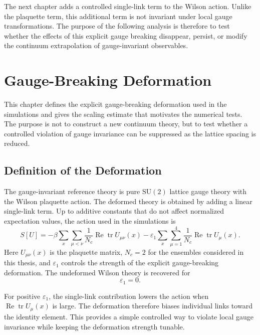 \documentclass[12pt,a4paper,oneside,numbers=noenddot]{scrreprt}
\newcommand{\SU}{\mathrm{SU}}
\newcommand{\eps}{\varepsilon}
\begin{document}
The next chapter adds a controlled single-link term to the Wilson action. Unlike
the plaquette term, this additional term is not invariant under local gauge
transformations. The purpose of the following analysis is therefore to test
whether the effects of this explicit gauge breaking disappear, persist, or
modify the continuum extrapolation of gauge-invariant observables.

\chapter{Gauge-Breaking Deformation}
\label{chap:small-breaking}

This chapter defines the explicit gauge-breaking deformation used in the
simulations and gives the scaling estimate that motivates the numerical tests.
The purpose is not to construct a new continuum theory, but to test whether a
controlled violation of gauge invariance can be suppressed as the lattice
spacing is reduced.

\section{Definition of the Deformation}
\label{sec:definition-gauge-breaking-deformation}

The gauge-invariant reference theory is pure \(\SU(2)\) lattice gauge theory
with the Wilson plaquette action. The deformed theory is obtained by adding a
linear single-link term. Up to additive constants that do not affect normalized
expectation values, the action used in the simulations is
\begin{equation}
  S[U]
  =
  -\beta
  \sum_x
  \sum_{\mu<\nu}
  \frac{1}{N_c}
  \operatorname{Re}\operatorname{tr} U_{\mu\nu}(x)
  -
  \eps_1
  \sum_x
  \sum_{\mu=1}^{4}
  \frac{1}{N_c}
  \operatorname{Re}\operatorname{tr} U_\mu(x).
  \label{eq:gauge-breaking-action}
\end{equation}
Here \(U_{\mu\nu}(x)\) is the plaquette matrix, \(N_c=2\) for the ensembles
considered in this thesis, and \(\eps_1\) controls the strength of the explicit
gauge-breaking deformation. The undeformed Wilson theory is recovered for
\begin{equation}
  \eps_1 = 0 .
\end{equation}

For positive \(\eps_1\), the single-link contribution lowers the action when
\(\operatorname{Re}\operatorname{tr}U_\mu(x)\) is large. The deformation
therefore biases individual links toward the identity element. This provides a
simple controlled way to violate local gauge invariance while keeping the
deformation strength tunable.
\end{document}
